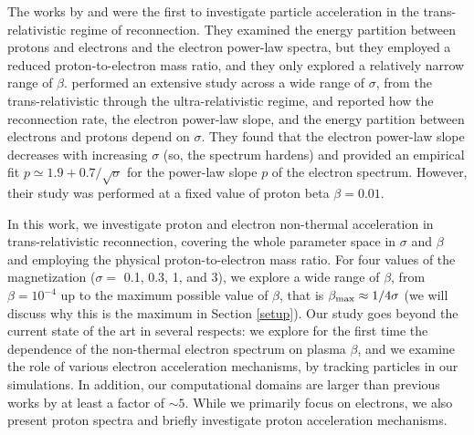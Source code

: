The works by \citet{melzani2014b} and \citet{melzani2014} were the first to investigate particle acceleration in the trans-relativistic regime of reconnection. They examined the energy partition between protons and electrons and the electron power-law spectra, but they employed a reduced proton-to-electron mass ratio, and they only explored a relatively narrow range of $\beta$. \citet{werner2018} performed an extensive study across a wide range of $\sigma$, from the trans-relativistic through the ultra-relativistic regime, and reported how the reconnection rate, the electron power-law slope, and the energy partition between electrons and protons depend on $\sigma$.  They found that the electron power-law slope decreases with increasing $\sigma$ (so, the spectrum hardens) and provided an empirical fit $p\simeq1.9+0.7/\sqrt{\sigma}$ for the power-law slope $p$ of the electron spectrum.  However, their study was performed at a fixed value of proton beta $\beta=0.01$.  



In this work, we investigate proton and electron non-thermal acceleration in trans-relativistic  reconnection, covering the whole parameter space in $\sigma$ and $\beta$ and employing the physical proton-to-electron mass ratio. For four values of the magnetization ($\sigma=$ 0.1, 0.3, 1, and 3), we explore a wide range of $\beta$, from $\beta=10^{-4}$ up to the maximum possible value of $\beta$, that is $\beta_{\rm max}\approx 1/4\sigma$ (we will discuss why this is the maximum in Section \ref{setup}). Our study goes beyond the current state of the art in several respects: we explore for the first time the dependence of the non-thermal electron spectrum on  plasma $\beta$, and we examine the role of various electron acceleration mechanisms, by tracking particles in our simulations. In addition, our computational domains are larger than previous works by at least a factor of $\sim5$.
While we primarily focus on electrons, we also present proton spectra and briefly investigate proton acceleration mechanisms.

